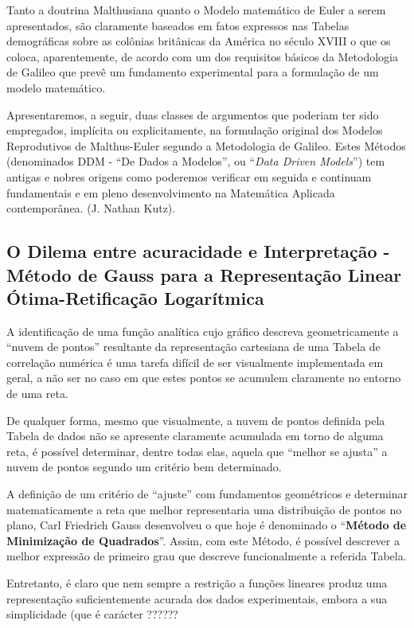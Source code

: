     Tanto a doutrina Malthusiana quanto o Modelo matemático de Euler a serem apresentados, são claramente baseados em fatos expressos nas Tabelas demográficas sobre as colônias britânicas da América no século XVIII o que os coloca, aparentemente, de acordo com um dos requisitos básicos da Metodologia de Galileo que prevê um fundamento experimental para a formulação de um modelo matemático.

    Apresentaremos, a seguir, duas classes de argumentos que poderiam ter sido empregados, implícita ou explicitamente, na formulação original dos Modelos Reprodutivos de Malthus-Euler segundo a Metodologia de Galileo. Estes Métodos (denominados DDM - ``De Dados a Modelos'', ou ``\textit{Data Driven Models}'') tem antigas e nobres origens como poderemos verificar em seguida e continuam fundamentais e em pleno desenvolvimento na Matemática Aplicada contemporânea. (J. Nathan Kutz).

    \subsection{O Dilema entre acuracidade e Interpretação - Método de Gauss para a Representação Linear Ótima-Retificação Logarítmica}

    A identificação de uma função analítica cujo gráfico descreva geometricamente a ``nuvem de pontos'' resultante da representação cartesiana de uma Tabela de correlação numérica é uma tarefa difícil de ser visualmente implementada em geral, a não ser no caso em que estes pontos se acumulem claramente no entorno de uma reta.

    De qualquer forma, mesmo que visualmente, a nuvem de pontos definida pela Tabela de dados não se apresente claramente acumulada em torno de alguma reta, é possível determinar, dentre todas elas, aquela que ``melhor se ajusta'' a nuvem de pontos segundo um critério bem determinado.

    A definição de um critério de ``ajuste'' com fundamentos geométricos e determinar matematicamente a reta que melhor representaria uma distribuição de pontos no plano, Carl Friedrich Gauss desenvolveu o que hoje é denominado o ``\textbf{Método de Minimização de Quadrados}''. Assim, com este Método, é possível descrever a melhor expressão de primeiro grau que descreve funcionalmente a referida Tabela.
    
    Entretanto, é claro que nem sempre a restrição a funções lineares produz uma representação suficientemente acurada dos dados experimentais, embora a sua simplicidade (que é carácter {\color{red} ??????}

